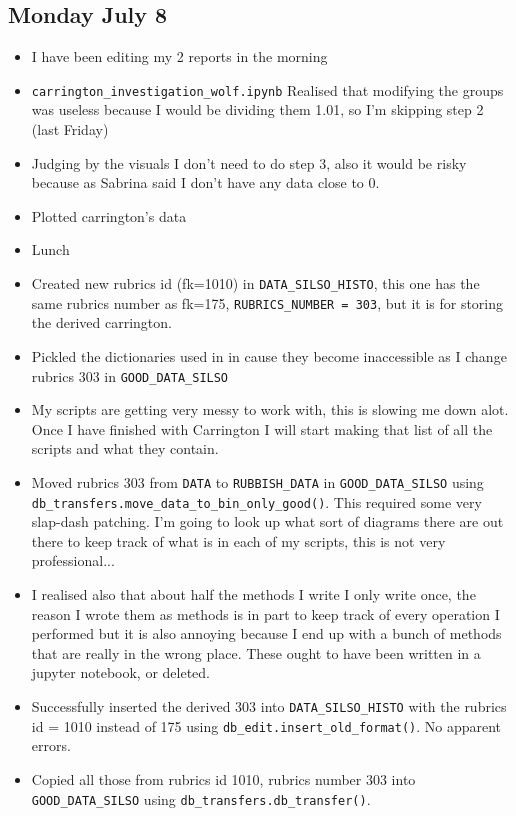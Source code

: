 \documentclass[12pt]{article}
\begin{document}
\subsection{Monday July 8}
\begin{itemize}
    \item I have been editing my 2 reports in the morning
    \item \texttt{carrington\_investigation\_wolf.ipynb} Realised that modifying the groups was useless because I would be dividing them 1.01, so I'm skipping step 2 (last Friday)
    \item Judging by the visuals I don't need to do step 3, also it would be risky because as Sabrina said I don't have any data close to 0.
    \item Plotted carrington's data
    \item Lunch
    \item Created new rubrics id (fk=1010) in \texttt{DATA\_SILSO\_HISTO}, this one has the same rubrics number as fk=175, \texttt{RUBRICS\_NUMBER = 303}, but it is for storing the derived carrington.
    \item Pickled the dictionaries used in  in cause they become inaccessible as I change rubrics 303 in \texttt{GOOD\_DATA\_SILSO}
    \item My scripts are getting very messy to work with, this is slowing me down alot. Once I have finished with Carrington I will start making that list of all the scripts and what they contain.
    \item Moved rubrics 303 from \texttt{DATA} to \texttt{RUBBISH\_DATA} in \texttt{GOOD\_DATA\_SILSO} using \texttt{db\_transfers.move\_data\_to\_bin\_only\_good()}. This required some very slap-dash patching. I'm going to look up what sort of diagrams there are out there to keep track of what is in each of my scripts, this is not very professional...
    \item I realised also that about half the methods I write I only write once, the reason I wrote them as methods is in part to keep track of every operation I performed but it is also annoying because I end up with a bunch of methods that are really in the wrong place. These ought to have been written in a jupyter notebook, or deleted.
    \item Successfully inserted the derived 303 into \texttt{DATA\_SILSO\_HISTO} with the rubrics id = 1010 instead of 175 using \texttt{db\_edit.insert\_old\_format()}. No apparent errors.
    \item Copied all those from rubrics id 1010, rubrics number 303 into \texttt{GOOD\_DATA\_SILSO} using \texttt{db\_transfers.db\_transfer()}. 

\end{itemize}
\end{document}
